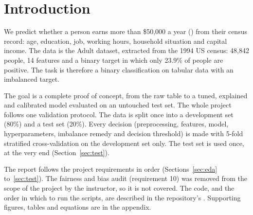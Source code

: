 \section{Introduction}
\label{sec:intro}

We predict whether a person earns more than \$50{,}000 a year (\pos) from their
census record: age, education, job, working hours, household situation and
capital income. The data is the Adult dataset, extracted from the 1994 US
census: 48{,}842 people, 14 features and a binary target in which only 23.9\% of
people are positive. The task is therefore a binary classification on tabular
data with an imbalanced target.

The goal is a complete proof of concept, from the raw table to a tuned,
explained and calibrated model evaluated on an untouched test set. The whole
project follows one validation protocol. The data is split once into a
development set (80\%) and a test set (20\%). Every decision (preprocessing,
features, model, hyperparameters, imbalance remedy and decision threshold) is
made with 5-fold stratified cross-validation on the development set only. The
test set is used once, at the very end (Section~\ref{sec:test}).

The report follows the project requirements in order (Sections~\ref{sec:eda}
to~\ref{sec:test}). The fairness and bias audit (requirement 10) was removed
from the scope of the project by the instructor, so it is not covered. The
code, and the order in which to run the scripts, are described in the
repository's . Supporting figures, tables and equations are in
the appendix.
